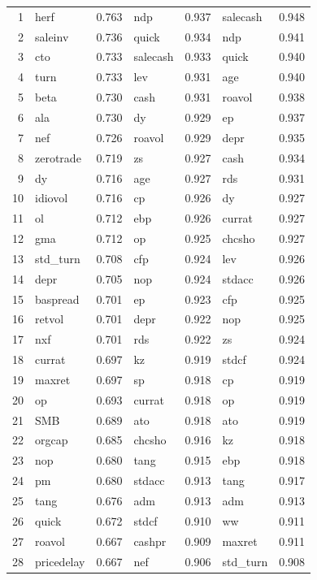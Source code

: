 \begin{footnotesize}
\begin{longtable}{r|lc|lc|lc}
		
		1 & herf & 0.763 & ndp & 0.937 & salecash & 0.948 \\ 
  2 & saleinv & 0.736 & quick & 0.934 & ndp & 0.941 \\ 
  3 & cto & 0.733 & salecash & 0.933 & quick & 0.940 \\ 
  4 & turn & 0.733 & lev & 0.931 & age & 0.940 \\ 
  5 & beta & 0.730 & cash & 0.931 & roavol & 0.938 \\ 
  6 & ala & 0.730 & dy & 0.929 & ep & 0.937 \\ 
  7 & nef & 0.726 & roavol & 0.929 & depr & 0.935 \\ 
  8 & zerotrade & 0.719 & zs & 0.927 & cash & 0.934 \\ 
  9 & dy & 0.716 & age & 0.927 & rds & 0.931 \\ 
  10 & idiovol & 0.716 & cp & 0.926 & dy & 0.927 \\ 
  11 & ol & 0.712 & ebp & 0.926 & currat & 0.927 \\ 
  12 & gma & 0.712 & op & 0.925 & chcsho & 0.927 \\ 
  13 & std\_turn & 0.708 & cfp & 0.924 & lev & 0.926 \\ 
  14 & depr & 0.705 & nop & 0.924 & stdacc & 0.926 \\ 
  15 & baspread & 0.701 & ep & 0.923 & cfp & 0.925 \\ 
  16 & retvol & 0.701 & depr & 0.922 & nop & 0.925 \\ 
  17 & nxf & 0.701 & rds & 0.922 & zs & 0.924 \\ 
  18 & currat & 0.697 & kz & 0.919 & stdcf & 0.924 \\ 
  19 & maxret & 0.697 & sp & 0.918 & cp & 0.919 \\ 
  20 & op & 0.693 & currat & 0.918 & op & 0.919 \\ 
  21 & SMB & 0.689 & ato & 0.918 & ato & 0.919 \\ 
  22 & orgcap & 0.685 & chcsho & 0.916 & kz & 0.918 \\ 
  23 & nop & 0.680 & tang & 0.915 & ebp & 0.918 \\ 
  24 & pm & 0.680 & stdacc & 0.913 & tang & 0.917 \\ 
  25 & tang & 0.676 & adm & 0.913 & adm & 0.913 \\ 
  26 & quick & 0.672 & stdcf & 0.910 & ww & 0.911 \\ 
  27 & roavol & 0.667 & cashpr & 0.909 & maxret & 0.911 \\ 
  28 & pricedelay & 0.667 & nef & 0.906 & std\_turn & 0.908 \\ 

\end{longtable}
\end{footnotesize}
